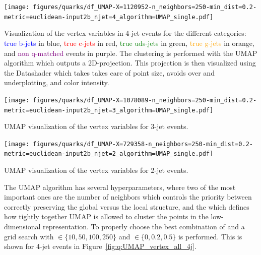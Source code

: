 \begin{marginfigure}[-13cm]
  \centerfloat
  \texttt{[image: figures/quarks/df\_UMAP-X=1120952-n\_neighbors=250-min\_dist=0.2-metric=euclidean-input2b\_njet=4\_algorithm=UMAP\_single.pdf]}
  \vspace{1mm}
  \caption[UMAP Visualization of the Vertex Variables for 4-Jet Events]
          {Visualization of the vertex variables in 4-jet events for the different categories: \textcolor{blue}{true b-jets} in blue, \textcolor{red}{true c-jets} in red, \textcolor{green}{true uds-jets} in green, \textcolor{orange}{true g-jets} in orange, and \textcolor{purple}{non q-matched} events in purple. The clustering is performed with the UMAP algorithm which outputs a 2D-projection. This projection is then visualized using the Datashader which takes takes care of point size, avoids over and underplotting, and color intensity.} 
  \label{fig:q:UMAP_vertex_4j}
  \vspace{5mm}
\end{marginfigure}

\begin{marginfigure}[-2cm]
  \centerfloat
  \texttt{[image: figures/quarks/df\_UMAP-X=1078089-n\_neighbors=250-min\_dist=0.2-metric=euclidean-input2b\_njet=3\_algorithm=UMAP\_single.pdf]}
  \vspace{1mm}
  \caption[UMAP Visualization of the Vertex Variables for 3-Jet Events]
          {UMAP visualization of the vertex variables for 3-jet events.} 
  \label{fig:q:UMAP_vertex_3j}
\end{marginfigure}

\begin{marginfigure}[0.5cm]
  \centerfloat
  \texttt{[image: figures/quarks/df\_UMAP-X=729358-n\_neighbors=250-min\_dist=0.2-metric=euclidean-input2b\_njet=2\_algorithm=UMAP\_single.pdf]}
  \vspace{1mm}
  \caption[UMAP Visualization of the Vertex Variables for 2-Jet Events]
          {UMAP visualization of the vertex variables for 2-jet events.} 
  \label{fig:q:UMAP_vertex_2j}
\end{marginfigure}

The UMAP algorithm has several hyperparameters, where two of the most important ones are the number of neighbors  which controls the priority between correctly preserving the global versus the local structure, and the  which defines how tightly together UMAP is allowed to cluster the points in the low-dimensional representation. To properly choose the best combination of  and  a grid search with  ${\in \{10, 50, 100, 250 \}}$ and $\in \{0, 0.2, 0.5\}$ is performed. This is shown for 4-jet events in Figure~\ref{fig:q:UMAP_vertex_all_4j}. 


